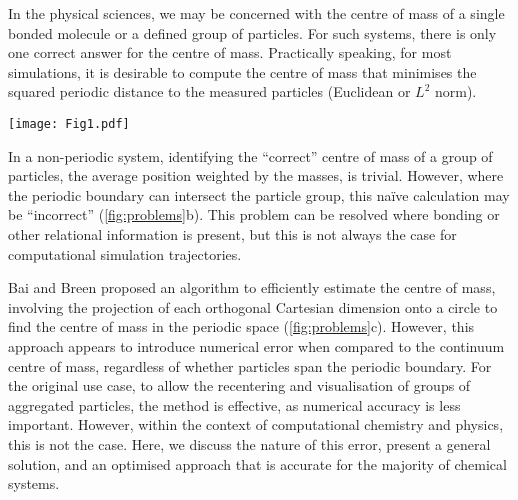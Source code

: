 \documentclass[reprint,superscriptaddress,nobibnotes,amsmath,amssymb,aip]{revtex4-2}
\begin{document}
In the physical sciences, we may be concerned with the centre of mass of a single bonded molecule or a defined group of particles.
For such systems, there is only one correct answer for the centre of mass.
Practically speaking, for most simulations, it is desirable to compute the centre of mass that minimises the squared periodic distance to the measured particles (Euclidean or \( L^2 \) norm).
%
\begin{figure*}
  \texttt{[image: Fig1.pdf]}
  \caption{
  (a) Demonstration of the $N$ possible centres of mass in an $N$ particle system, where two periodic cells are visible, and the dashed line indicates the particle grouping that leads to a given centre of mass (green cross). 
  (b) The problem with the naïve centre of mass (red cross) calculation in periodic systems; where the top shows the particle group in a single cell, compared with the bottom where the particle group spans a periodic boundary. 
  (c) The projection of the particles in the bottom diagram of (b) onto a circle to find the centre of mass (yellow cross), which minimises the weighted distance to all particles on the planar disk of the circle.}
  \label{fig:problems}
\end{figure*}
%

In a non-periodic system, identifying the ``correct'' centre of mass of a group of particles, the average position weighted by the masses, is trivial. 
However, where the periodic boundary can intersect the particle group, this naïve calculation may be ``incorrect'' (\cref{fig:problems}b). 
This problem can be resolved where bonding or other relational information is present, but this is not always the case for computational simulation trajectories. 

Bai and Breen proposed an algorithm to efficiently estimate the centre of mass,\cite{bai_calculating_2008} involving the projection of each orthogonal Cartesian dimension onto a circle to find the centre of mass in the periodic space (\cref{fig:problems}c). 
However, this approach appears to introduce numerical error when compared to the continuum centre of mass, regardless of whether particles span the periodic boundary. 
For the original use case, to allow the recentering and visualisation of groups of aggregated particles, the method is effective, as numerical accuracy is less important. 
However, within the context of computational chemistry and physics, this is not the case.  
Here, we discuss the nature of this error, present a general solution, and an optimised approach that is accurate for the majority of chemical systems.
\end{document}
